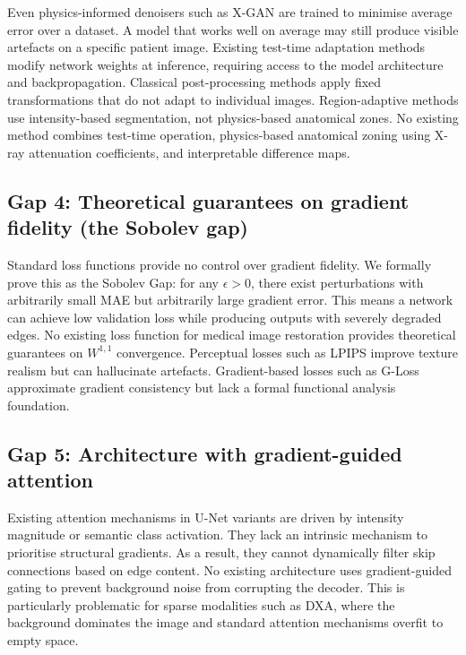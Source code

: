 Even physics-informed denoisers such as X-GAN are trained to minimise average error over a dataset. A model that works well on average may still produce visible artefacts on a specific patient image. Existing test-time adaptation methods modify network weights at inference, requiring access to the model architecture and backpropagation. Classical post-processing methods apply fixed transformations that do not adapt to individual images. Region-adaptive methods use intensity-based segmentation, not physics-based anatomical zones. No existing method combines test-time operation, physics-based anatomical zoning using X-ray attenuation coefficients, and interpretable difference maps.

\subsection{Gap 4: Theoretical guarantees on gradient fidelity (the Sobolev gap)}

Standard loss functions provide no control over gradient fidelity. We formally prove this as the Sobolev Gap: for any \(\epsilon > 0\), there exist perturbations with arbitrarily small MAE but arbitrarily large gradient error. This means a network can achieve low validation loss while producing outputs with severely degraded edges. No existing loss function for medical image restoration provides theoretical guarantees on \(W^{1,1}\) convergence. Perceptual losses such as LPIPS improve texture realism but can hallucinate artefacts. Gradient-based losses such as G-Loss approximate gradient consistency but lack a formal functional analysis foundation.

\subsection{Gap 5: Architecture with gradient-guided attention}

Existing attention mechanisms in U-Net variants are driven by intensity magnitude or semantic class activation. They lack an intrinsic mechanism to prioritise structural gradients. As a result, they cannot dynamically filter skip connections based on edge content. No existing architecture uses gradient-guided gating to prevent background noise from corrupting the decoder. This is particularly problematic for sparse modalities such as DXA, where the background dominates the image and standard attention mechanisms overfit to empty space.
